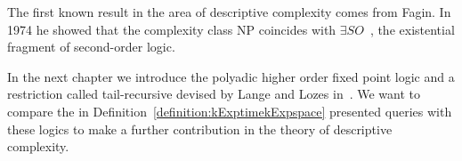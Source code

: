 The first known result in the area of descriptive complexity comes from Fagin. In 1974 he showed that the complexity
class NP coincides with $\exists SO$~\cite{fagin1974generalized}, the existential fragment of second-order logic.

In the next chapter we introduce the polyadic higher order fixed point logic and a restriction called tail-recursive
devised by Lange and Lozes in~\cite{lange2014capturing}. We want to compare the in
Definition~\ref{definition:kExptimekExpspace} presented queries with these logics to make a further contribution in
the theory of descriptive complexity.